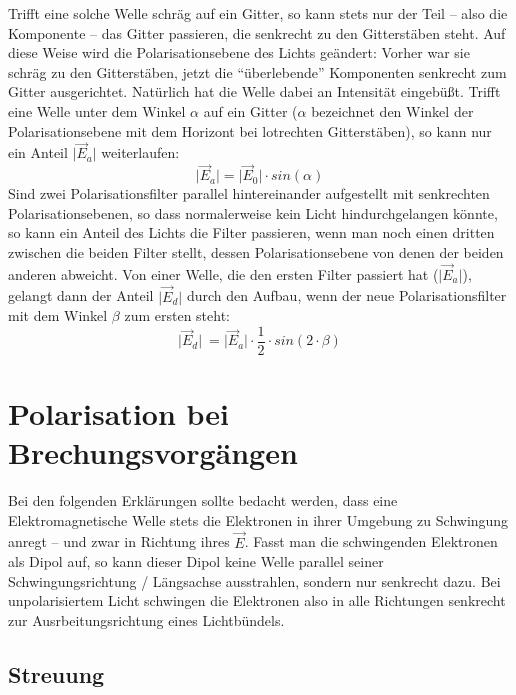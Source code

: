 Trifft eine solche Welle schräg auf ein Gitter, so kann stets nur der Teil -- also die Komponente -- das Gitter passieren, die senkrecht zu den Gitterstäben steht. Auf diese Weise wird die Polarisationsebene des Lichts geändert: Vorher war sie schräg zu den Gitterstäben, jetzt die "`überlebende"' Komponenten senkrecht zum Gitter ausgerichtet. Natürlich hat die Welle dabei an Intensität eingebüßt. Trifft eine Welle unter dem Winkel \(\alpha\) auf ein Gitter (\(\alpha\) bezeichnet den Winkel der Polarisationsebene mit dem Horizont bei lotrechten Gitterstäben), so kann nur ein Anteil \( \vert \vec{E}_a \vert \) weiterlaufen:
\begin{equation}
   \vert \vec{E}_a \vert = \vert \vec{E}_0 \vert \cdot sin(\alpha)
\end{equation}
Sind zwei Polarisationsfilter parallel hintereinander aufgestellt mit senkrechten Polarisationsebenen, so dass normalerweise kein Licht hindurchgelangen könnte, so kann ein Anteil des Lichts die Filter passieren, wenn man noch einen dritten zwischen die beiden Filter stellt, dessen Polarisationsebene von denen der beiden anderen abweicht. Von einer Welle, die den ersten Filter passiert hat (\(\vert \vec{E}_a \vert\)), gelangt dann der Anteil \(\vert \vec{E}_d \vert\) durch den Aufbau, wenn der neue Polarisationsfilter mit dem Winkel \(\beta\) zum ersten steht:
\begin{equation}
   \vert \vec{E}_d \vert\ = \vert \vec{E}_a \vert \cdot \frac{1}{2} \cdot sin(2 \cdot \beta)
\end{equation}





	\section{Polarisation bei Brechungsvorgängen}

Bei den folgenden Erklärungen sollte bedacht werden, dass eine Elektromagnetische Welle stets die Elektronen in ihrer Umgebung zu Schwingung anregt -- und zwar in Richtung ihres \(\vec{E}\). Fasst man die schwingenden Elektronen als Dipol auf, so kann dieser Dipol keine Welle parallel seiner Schwingungsrichtung / Längsachse ausstrahlen, sondern nur senkrecht dazu. Bei unpolarisiertem Licht schwingen die Elektronen also in alle Richtungen senkrecht zur Ausrbeitungsrichtung eines Lichtbündels.

	
		\subsection{Streuung}
		
